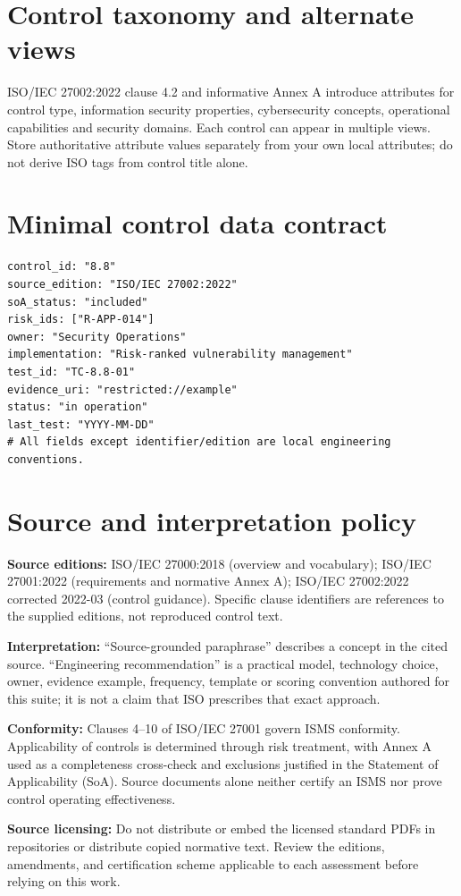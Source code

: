 \documentclass[11pt,letterpaper]{article}
\begin{document}
\section{Control taxonomy and alternate views}
\SourceTag ISO/IEC 27002:2022 clause 4.2 and informative Annex A introduce attributes for control type, information security properties, cybersecurity concepts, operational capabilities and security domains. Each control can appear in multiple views. \EngineeringTag Store authoritative attribute values separately from your own local attributes; do not derive ISO tags from control title alone.
\section{Minimal control data contract}
\begin{verbatim}
control_id: "8.8"
source_edition: "ISO/IEC 27002:2022"
soA_status: "included"
risk_ids: ["R-APP-014"]
owner: "Security Operations"
implementation: "Risk-ranked vulnerability management"
test_id: "TC-8.8-01"
evidence_uri: "restricted://example"
status: "in operation"
last_test: "YYYY-MM-DD"
# All fields except identifier/edition are local engineering conventions.
\end{verbatim}
\clearpage\section*{Source and interpretation policy}
\textbf{Source editions:} ISO/IEC 27000:2018 (overview and vocabulary); ISO/IEC 27001:2022 (requirements and normative Annex A); ISO/IEC 27002:2022 corrected 2022-03 (control guidance). Specific clause identifiers are references to the supplied editions, not reproduced control text.\par
\textbf{Interpretation:} ``Source-grounded paraphrase'' describes a concept in the cited source. ``Engineering recommendation'' is a practical model, technology choice, owner, evidence example, frequency, template or scoring convention authored for this suite; it is not a claim that ISO prescribes that exact approach.\par
\textbf{Conformity:} Clauses 4--10 of ISO/IEC 27001 govern ISMS conformity. Applicability of controls is determined through risk treatment, with Annex A used as a completeness cross-check and exclusions justified in the Statement of Applicability (SoA). Source documents alone neither certify an ISMS nor prove control operating effectiveness.\par
\textbf{Source licensing:} Do not distribute or embed the licensed standard PDFs in repositories or distribute copied normative text. Review the editions, amendments, and certification scheme applicable to each assessment before relying on this work.\par
\end{document}
